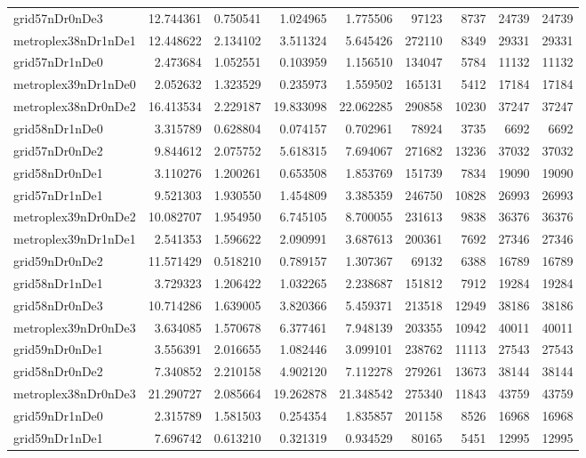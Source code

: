 \begin{longtable}{|l|r|r|r|r|r|r|r|r|}
grid57nDr0nDe3 & 12.744361 & 0.750541 & 1.024965 & 1.775506 & 97123 & 8737 & 24739 & 24739 \\
metroplex38nDr1nDe1 & 12.448622 & 2.134102 & 3.511324 & 5.645426 & 272110 & 8349 & 29331 & 29331 \\
grid57nDr1nDe0 & 2.473684 & 1.052551 & 0.103959 & 1.156510 & 134047 & 5784 & 11132 & 11132 \\
metroplex39nDr1nDe0 & 2.052632 & 1.323529 & 0.235973 & 1.559502 & 165131 & 5412 & 17184 & 17184 \\
metroplex38nDr0nDe2 & 16.413534 & 2.229187 & 19.833098 & 22.062285 & 290858 & 10230 & 37247 & 37247 \\
grid58nDr1nDe0 & 3.315789 & 0.628804 & 0.074157 & 0.702961 & 78924 & 3735 & 6692 & 6692 \\
grid57nDr0nDe2 & 9.844612 & 2.075752 & 5.618315 & 7.694067 & 271682 & 13236 & 37032 & 37032 \\
grid58nDr0nDe1 & 3.110276 & 1.200261 & 0.653508 & 1.853769 & 151739 & 7834 & 19090 & 19090 \\
grid57nDr1nDe1 & 9.521303 & 1.930550 & 1.454809 & 3.385359 & 246750 & 10828 & 26993 & 26993 \\
metroplex39nDr0nDe2 & 10.082707 & 1.954950 & 6.745105 & 8.700055 & 231613 & 9838 & 36376 & 36376 \\
metroplex39nDr1nDe1 & 2.541353 & 1.596622 & 2.090991 & 3.687613 & 200361 & 7692 & 27346 & 27346 \\
grid59nDr0nDe2 & 11.571429 & 0.518210 & 0.789157 & 1.307367 & 69132 & 6388 & 16789 & 16789 \\
grid58nDr1nDe1 & 3.729323 & 1.206422 & 1.032265 & 2.238687 & 151812 & 7912 & 19284 & 19284 \\
grid58nDr0nDe3 & 10.714286 & 1.639005 & 3.820366 & 5.459371 & 213518 & 12949 & 38186 & 38186 \\
metroplex39nDr0nDe3 & 3.634085 & 1.570678 & 6.377461 & 7.948139 & 203355 & 10942 & 40011 & 40011 \\
grid59nDr0nDe1 & 3.556391 & 2.016655 & 1.082446 & 3.099101 & 238762 & 11113 & 27543 & 27543 \\
grid58nDr0nDe2 & 7.340852 & 2.210158 & 4.902120 & 7.112278 & 279261 & 13673 & 38144 & 38144 \\
metroplex38nDr0nDe3 & 21.290727 & 2.085664 & 19.262878 & 21.348542 & 275340 & 11843 & 43759 & 43759 \\
grid59nDr1nDe0 & 2.315789 & 1.581503 & 0.254354 & 1.835857 & 201158 & 8526 & 16968 & 16968 \\
grid59nDr1nDe1 & 7.696742 & 0.613210 & 0.321319 & 0.934529 & 80165 & 5451 & 12995 & 12995 \\

\end{longtable}
